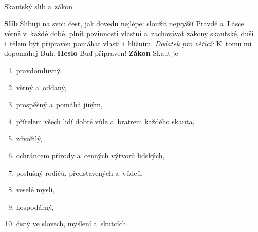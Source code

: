 \documentclass[compress, ucs, xelatex, xcolor=dvipsnames, print,
  hyperref={
    bookmarks=true,
    unicode=true,
    colorlinks=true,
    plainpages=false,
    pdfkeywords={Skaut, Junak, Skauting, Vychovna metoda},
    linkcolor=Black,
    anchorcolor=Black,
    citecolor=OliveGreen,
    filecolor=OliveGreen,
    menucolor=Black,
    urlcolor=OliveGreen,
    pdftex}
  ]{beamer}
\begin{document}
\begin{frame}{Skautský slib a~zákon}
  \begin{multicols}{3}
    \vfill
    \textbf{Slib}
    \vfill
    Slibuji na svou čest, jak dovedu nejlépe: sloužit nejvyšší Pravdě a~Lásce věrně v~každé době, plnit povinnosti vlastní a~zachovávat zákony skautské, duší i~tělem být připraven pomáhat vlasti i~bližním.
    \vfill
    \textit{Dodatek pro věřící:} K~tomu mi dopomáhej Bůh.
    \vfill
    \textbf{Heslo}
    \vfill
    Buď připraven!
    \vfill
    \textbf{Zákon}
    \vfill
    Skaut je
    \begin{enumerate}
      \item pravdomluvný,
      \item věrný a~oddaný,
      \item prospěšný a~pomáhá jiným,
      \item přítelem všech lidí dobré vůle a~bratrem každého skauta,
      \item zdvořilý,
      \item ochráncem přírody a~cenných výtvorů lidských,
      \item poslušný rodičů, představených a~vůdců,
      \item veselé mysli,
      \item hospodárný,
      \item čistý ve slovech, myšlení a~skutcích.
    \end{enumerate}
  \end{multicols}
\end{frame}
\end{document}
